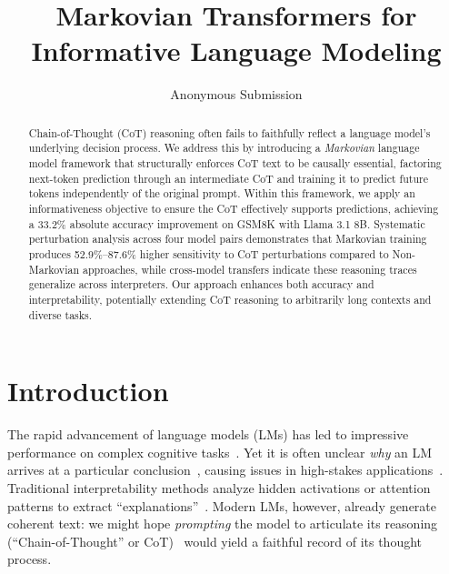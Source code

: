 \documentclass[letterpaper]{article} %
\title{Markovian Transformers for Informative Language Modeling}
\author{
    Anonymous Submission
}
\begin{document}
\maketitle

\begin{abstract}
  Chain-of-Thought (CoT) reasoning often fails to faithfully reflect a language model's underlying decision process. We address this by introducing a \emph{Markovian} language model framework that structurally enforces CoT text to be causally essential, factoring next-token prediction through an intermediate CoT and training it to predict future tokens independently of the original prompt. Within this framework, we apply an informativeness objective to ensure the CoT effectively supports predictions, achieving a 33.2\% absolute accuracy improvement on GSM8K with Llama 3.1 8B. Systematic perturbation analysis across four model pairs demonstrates that Markovian training produces 52.9\%--87.6\% higher sensitivity to CoT perturbations compared to Non-Markovian approaches, while cross-model transfers indicate these reasoning traces generalize across interpreters. Our approach enhances both accuracy and interpretability, potentially extending CoT reasoning to arbitrarily long contexts and diverse tasks.
\
\end{abstract}


\section{Introduction}
\label{sec:intro}
The rapid advancement of language models (LMs) has led to impressive performance on complex cognitive tasks~\citep{NEURIPS2020_1457c0d6}. Yet it is often unclear \emph{why} an LM arrives at a particular conclusion~\citep{lamparth2023analyzing,burns2024discovering,gurnee2024language}, causing issues in high-stakes applications~\citep{Grabb2024.04.07.24305462,lamparth2024human,rivera2024escalation}. Traditional interpretability methods analyze hidden activations or attention patterns to extract ``explanations''~\citep{geiger2022inducing,geva2022transformer,meng2022locating,raukur2022toward,wang2022interpretability,lamparth2023analyzing,nanda2023progress}. Modern LMs, however, already generate coherent text: we might hope \emph{prompting} the model to articulate its reasoning (``Chain-of-Thought'' or CoT)~\citep{nye2022show,wei2022chain} would yield a faithful record of its thought process. 
\end{document}
